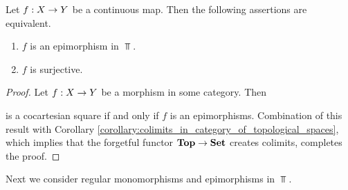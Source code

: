 \begin{proposition}\label{proposition:epimorphisms_in_topological_spaces}
	Let $f:X\rightarrow Y$ be a continuous map. Then the following assertions are equivalent.
	\begin{enumerate}[label=\emph{\textbf{(\roman*)}}, leftmargin=3.0em]
		\item $f$ is an epimorphism in $\Top$.
		\item $f$ is surjective.
	\end{enumerate}
\end{proposition}
\begin{proof}
	Let $f:X\rightarrow Y$ be a morphism in some category. Then
	\begin{center}
	\end{center}
	is a cocartesian square if and only if $f$ is an epimorphisms. Combination of this result with Corollary \ref{corollary:colimits_in_category_of_topological_spaces}, which implies that the forgetful functor $\mathbf{Top} \rightarrow \mathbf{Set}$ creates colimits, completes the proof.
\end{proof}
\noindent
Next we consider regular monomorphisms and epimorphisms in $\Top$.

